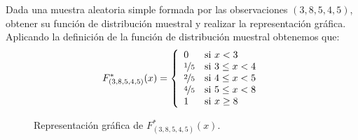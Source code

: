 \begin{ejemplo}
    Dada una muestra aleatoria simple formada por las observaciones $(3, 8, 5, 4, 5)$, obtener su función de distribución muestral y realizar la representación gráfica.\\

    \noindent
    Aplicando la definición de la función de distribución muestral obtenemos que:
    \begin{equation*}
        F_{(3, 8, 5, 4, 5)}^\ast(x) = \left\{\begin{array}{ll}
                0 & \text{si\ } x < 3 \\
                \nicefrac{1}{5} & \text{si\ } 3 \leq x < 4 \\
                \nicefrac{2}{5} & \text{si\ } 4 \leq x < 5 \\
                \nicefrac{4}{5} & \text{si\ } 5 \leq x < 8 \\
                1 & \text{si\ } x \geq 8 
        \end{array}\right.
    \end{equation*}

    \begin{figure}[H]
        \centering
        \caption{Representación gráfica de $F_{(3,8,5,4,5)}^\ast (x)$.}
    \end{figure}
\end{ejemplo}

